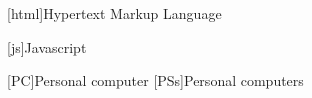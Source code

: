 
\begin{acronym}
[html]{Hypertext Markup Language}
\end{acronym}

\begin{acronym}
[js]{Javascript}
\end{acronym}


\begin{acronym}
[PC]{Personal computer}
[PSs]{Personal computers}
\end{acronym}
